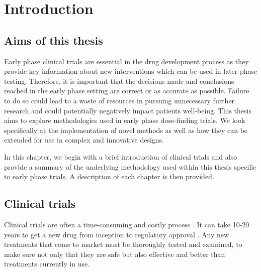 
\chapter{Introduction} %

\label{Intro} %

\section{Aims of this thesis}
Early phase clinical trials are essential in the drug development process as they provide key information about new interventions which can be used in later-phase testing. Therefore, it is important that the decisions made and conclusions reached in the early phase setting are correct or as accurate as possible. Failure to do so could lead to a waste of resources in pursuing unnecessary further research and could potentially negatively impact patients well-being. This thesis aims to explore methodologies used in early phase dose-finding trials. We look specifically at the implementation of novel methods as well as how they can be extended for use in complex and innovative designs. 

In this chapter, we begin with a brief introduction of clinical trials and also provide a summary of the underlying methodology used within this thesis specific to early phase trials. A description of each chapter is then provided. 

\section{Clinical trials}

Clinical trials are often a time-consuming and costly process \cite{fogelFactorsAssociatedClinical2018}. It can take 10-20 years to get a new drug from inception to regulatory approval \cite{lipskyIdeaMarketDrug2001, mohsDrugDiscoveryDevelopment2017}. Any new treatments that come to market must be thoroughly tested and examined, to make sure not only that they are safe but also effective and better than treatments currently in use.

